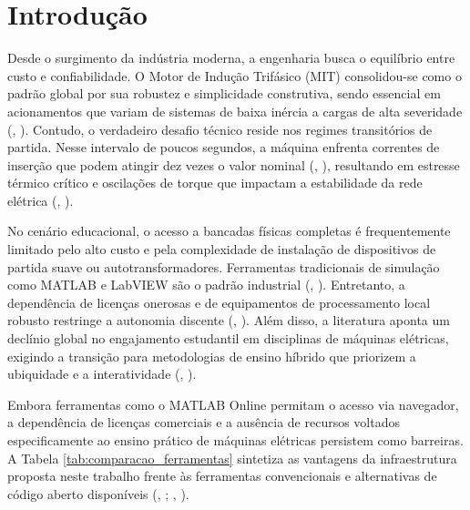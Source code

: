 \documentclass[a4paper]{ifacconf}
\begin{document}

\section{Introdução}

Desde o surgimento da indústria moderna, a engenharia busca o equilíbrio entre custo e confiabilidade. O Motor de Indução Trifásico (MIT) consolidou-se como o padrão global por sua robustez e simplicidade construtiva, sendo essencial em acionamentos que variam de sistemas de baixa inércia a cargas de alta severidade (\citeauthor{Umans2014EN}, \citeyear{Umans2014EN}). Contudo, o verdadeiro desafio técnico reside nos regimes transitórios de partida. Nesse intervalo de poucos segundos, a máquina enfrenta correntes de inserção que podem atingir dez vezes o valor nominal (\citeauthor{jain2014modeling}, \citeyear{jain2014modeling}), resultando em estresse térmico crítico e oscilações de torque que impactam a estabilidade da rede elétrica (\citeauthor{ikeda2007simulation}, \citeyear{ikeda2007simulation}).

No cenário educacional, o acesso a bancadas físicas completas é frequentemente limitado pelo alto custo e pela complexidade de instalação de dispositivos de partida suave ou autotransformadores. Ferramentas tradicionais de simulação como MATLAB e LabVIEW são o padrão industrial (\citeauthor{aktaibi2011dynamic}, \citeyear{aktaibi2011dynamic}). Entretanto, a dependência de licenças onerosas e de equipamentos de processamento local robusto restringe a autonomia discente (\citeauthor{leedy2013simulink}, \citeyear{leedy2013simulink}). Além disso, a literatura aponta um declínio global no engajamento estudantil em disciplinas de máquinas elétricas, exigindo a transição para metodologias de ensino híbrido que priorizem a ubiquidade e a interatividade (\citeauthor{singh2019improving}, \citeyear{singh2019improving}).

Embora ferramentas como o MATLAB Online permitam o acesso via navegador, a dependência de licenças comerciais e a ausência de recursos voltados especificamente ao ensino prático de máquinas elétricas persistem como barreiras. A Tabela \ref{tab:comparacao_ferramentas} sintetiza as vantagens da infraestrutura proposta neste trabalho frente às ferramentas convencionais e alternativas de código aberto disponíveis (\citeauthor{li2010simulation}, \citeyear{li2010simulation}; \citeauthor{leedy2013simulink}, \citeyear{leedy2013simulink}).
\end{document}
